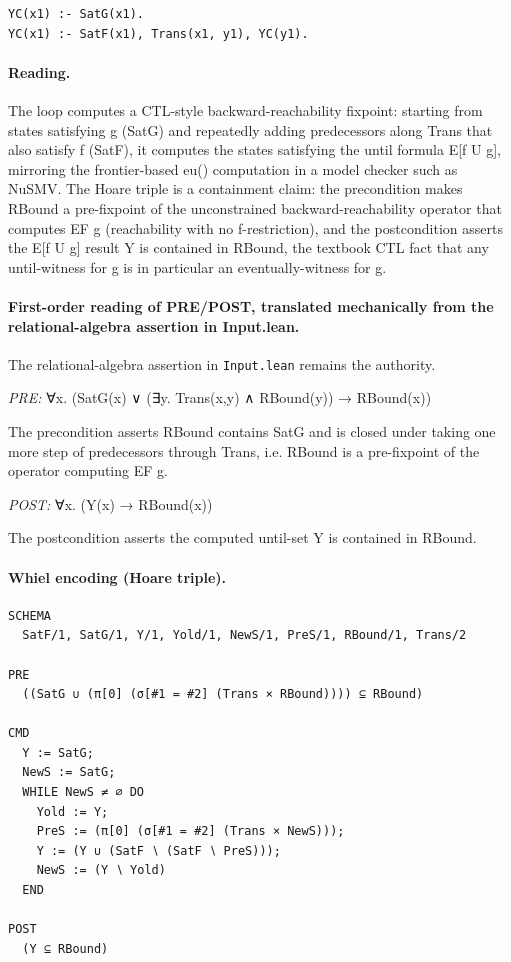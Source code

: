 \documentclass[10pt]{article}
\begin{document}
\begin{Verbatim}[fontsize=\scriptsize,breaklines=true,breakanywhere=true,frame=single,framesep=1.5mm]
YC(x1) :- SatG(x1).
YC(x1) :- SatF(x1), Trans(x1, y1), YC(y1).
\end{Verbatim}

\paragraph{Reading.} The loop computes a CTL-style backward-reachability fixpoint: starting from states satisfying g (SatG) and repeatedly adding predecessors along Trans that also satisfy f (SatF), it computes the states satisfying the until formula E[f U g], mirroring the frontier-based eu() computation in a model checker such as NuSMV. The Hoare triple is a containment claim: the precondition makes RBound a pre-fixpoint of the unconstrained backward-reachability operator that computes EF g (reachability with no f-restriction), and the postcondition asserts the E[f U g] result Y is contained in RBound, the textbook CTL fact that any until-witness for g is in particular an eventually-witness for g.

\paragraph{First-order reading of PRE/POST, translated mechanically from the relational-algebra assertion in Input.lean.} The relational-algebra assertion in \texttt{Input.lean} remains the authority.

\textit{PRE:} ∀x. (SatG(x) ∨ (∃y. Trans(x,y) ∧ RBound(y)) → RBound(x))\par The precondition asserts RBound contains SatG and is closed under taking one more step of predecessors through Trans, i.e. RBound is a pre-fixpoint of the operator computing EF g.

\textit{POST:} ∀x. (Y(x) → RBound(x))\par The postcondition asserts the computed until-set Y is contained in RBound.

\paragraph{Whiel encoding (Hoare triple).}

\begin{Verbatim}[fontsize=\scriptsize,breaklines=true,breakanywhere=true,frame=single,framesep=1.5mm]
SCHEMA
  SatF/1, SatG/1, Y/1, Yold/1, NewS/1, PreS/1, RBound/1, Trans/2

PRE
  ((SatG ∪ (π[0] (σ[#1 = #2] (Trans × RBound)))) ⊆ RBound)

CMD
  Y := SatG;
  NewS := SatG;
  WHILE NewS ≠ ∅ DO
    Yold := Y;
    PreS := (π[0] (σ[#1 = #2] (Trans × NewS)));
    Y := (Y ∪ (SatF ∖ (SatF ∖ PreS)));
    NewS := (Y ∖ Yold)
  END

POST
  (Y ⊆ RBound)
\end{Verbatim}
\end{document}
